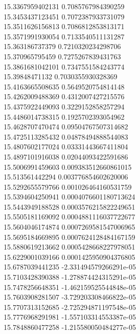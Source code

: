{15.3367959402131 0.7085767984390259 \\
15.3453437123451 0.7072387933731079 \\
15.3511626156813 0.7086812853813171 \\
15.3571991930054 0.7133540511131287 \\
15.363186737379 0.7210320234298706 \\
15.370965795459 0.7275267839431763 \\
15.3861681042101 0.7347551584243774 \\
15.39848471132 0.7030355930328369 \\
15.4163665508635 0.5649520754814148 \\
15.4262009488369 0.4312007427215576 \\
15.4375922449093 0.3229152858257294 \\
15.4486014738315 0.1925702393054962 \\
15.4628707470474 0.09504767507314682 \\
15.4725113285432 0.04878494888544083 \\
15.4807602177024 0.03331443667411804 \\
15.4897101916038 0.02044093422591686 \\
15.5006991459603 0.009383512660861015 \\
15.513561442294 0.003776854602620006 \\
15.5292655579766 0.001026464160531759 \\
15.5394604250941 0.0004076601180713624 \\
15.5443949188528 0.0003576215822249651 \\
15.5505181169092 0.0004881116037722677 \\
15.5604046174874 0.0007269581547006965 \\
15.5695184669895 0.0007624128484167159 \\
15.5880619213662 0.0005428668227978051 \\
15.6229001039166 0.0001425950904376805 \\
15.6787039441235 -2.331494579266291e-05 \\
15.7103428390388 -1.278874424315291e-05 \\
15.7478256648351 -1.462159525544848e-05 \\
15.7603908281507 -3.729203308466822e-05 \\
15.7707313152685 -2.725294871197548e-05 \\
15.7776968291981 -1.557103314553387e-05 \\
15.7848860477258 -1.215580050484277e-05 \\
}

